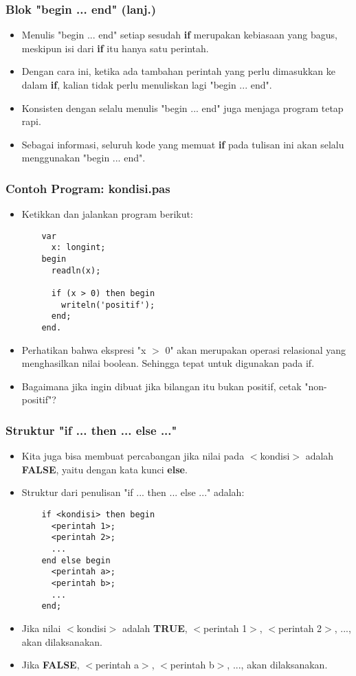 \begin{frame}[fragile]
\frametitle{Blok "begin ... end" (lanj.)}
\begin{itemize}
  \item Menulis "begin ... end" setiap sesudah \textbf{if} merupakan kebiasaan yang bagus, meskipun isi dari \textbf{if} itu hanya satu perintah.
  \item Dengan cara ini, ketika ada tambahan perintah yang perlu dimasukkan ke dalam \textbf{if}, kalian tidak perlu menuliskan lagi "begin ... end".
  \item Konsisten dengan selalu menulis "begin ... end" juga menjaga program tetap rapi.
  \item Sebagai informasi, seluruh kode yang memuat \textbf{if} pada tulisan ini akan selalu menggunakan "begin ... end".
\end{itemize}
\end{frame}

\begin{frame}[fragile]
\frametitle{Contoh Program: kondisi.pas}
\begin{itemize}
  \item Ketikkan dan jalankan program berikut:
  \begin{lstlisting}
    var
      x: longint;
    begin
      readln(x);

      if (x > 0) then begin
        writeln('positif');
      end;
    end.
  \end{lstlisting}
  \item Perhatikan bahwa ekspresi "x $>$ 0" akan merupakan operasi relasional yang menghasilkan nilai boolean. Sehingga tepat untuk digunakan pada if.
  \item Bagaimana jika ingin dibuat jika bilangan itu bukan positif, cetak "non-positif"?
\end{itemize}
\end{frame}

\begin{frame}[fragile]
\frametitle{Struktur "if ... then ... else ..."}
\begin{itemize}
  \item Kita juga bisa membuat percabangan jika nilai pada $<$kondisi$>$ adalah \textbf{FALSE}, yaitu dengan kata kunci \textbf{else}.
  \item Struktur dari penulisan "if ... then ... else ..." adalah:
  \begin{lstlisting}
    if <kondisi> then begin
      <perintah 1>;
      <perintah 2>;
      ...
    end else begin
      <perintah a>;
      <perintah b>;
      ...
    end;
  \end{lstlisting}

  \item Jika nilai $<$kondisi$>$ adalah \textbf{TRUE}, $<$perintah 1$>$, $<$perintah 2$>$, ..., akan dilaksanakan.
  \item Jika \textbf{FALSE}, $<$perintah a$>$, $<$perintah b$>$, ..., akan dilaksanakan.
\end{itemize}
\end{frame}

